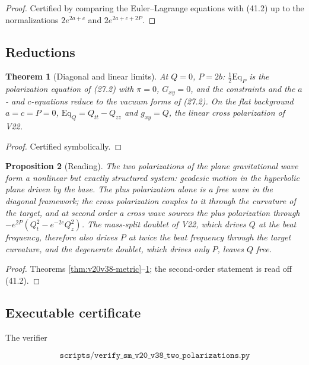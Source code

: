 \documentclass[11pt]{article}
\newtheorem{theorem}{Theorem}[section]
\newtheorem{proposition}[theorem]{Proposition}
\theoremstyle{remark}
\begin{document}
\begin{proof}
Certified by comparing the Euler--Lagrange equations with (41.2) up
to the normalizations \(2e^{2a+c}\) and \(2e^{2a+c+2P}\).
\end{proof}

\subsection{Reductions}

\begin{theorem}[Diagonal and linear limits]
\label{thm:v20v38-limits}
At \(Q=0\), \(P=2b\): \(\tfrac12\mathrm{Eq}_P\) is the polarization
equation of (27.2) with \(\pi=0\), \(G_{xy}=0\), and the constraints
and the \(a\)- and \(c\)-equations reduce to the vacuum forms of
(27.2).  On the flat background \(a=c=P=0\), \(\mathrm{Eq}_Q=Q_{tt}-Q_{zz}\)
and \(g_{xy}=Q\), the linear cross polarization of V22.
\end{theorem}

\begin{proof}
Certified symbolically.
\end{proof}

\begin{proposition}[Reading]
\label{prop:v20v38-reading}
The two polarizations of the plane gravitational wave form a
nonlinear but exactly structured system: geodesic motion in the
hyperbolic plane driven by the base.  The plus polarization alone is
a free wave in the diagonal framework; the cross polarization
couples to it through the curvature of the target, and at second
order a cross wave sources the plus polarization through
\(-e^{2P}(Q_t^2-e^{-2c}Q_z^2)\).  The mass-split doublet of V22, which
drives \(Q\) at the beat frequency, therefore also drives \(P\) at
twice the beat frequency through the target curvature, and the
degenerate doublet, which drives only \(P\), leaves \(Q\) free.
\end{proposition}

\begin{proof}
Theorems \ref{thm:v20v38-metric}--\ref{thm:v20v38-limits}; the
second-order statement is read off (41.2).
\end{proof}

\subsection{Executable certificate}

The verifier

\[
 \texttt{scripts/verify\_sm\_v20\_v38\_two\_polarizations.py}         \tag{41.5}
\]
\end{document}
